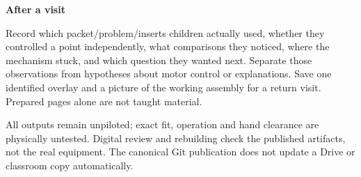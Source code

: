 \documentclass[11pt,letterpaper]{article}
\newcommand{\sub}[1]{\par\textbf{#1}\par}
\begin{document}
\sub{After a visit}
Record which packet/problem/inserts children actually used, whether they controlled a point independently, what comparisons they noticed, where the mechanism stuck, and which question they wanted next. Separate those observations from hypotheses about motor control or explanations. Save one identified overlay and a picture of the working assembly for a return visit. Prepared pages alone are not taught material.

All outputs remain unpiloted; exact fit, operation and hand clearance are physically untested. Digital review and rebuilding check the published artifacts, not the real equipment. The canonical Git publication does not update a Drive or classroom copy automatically.
\end{document}
